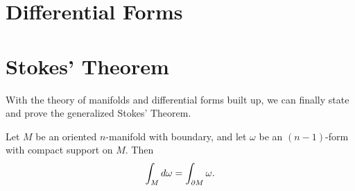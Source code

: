 \documentclass[twoside,10pt]{article}
\begin{document}
\section{Differential Forms}

\section{Stokes' Theorem}

With the theory of manifolds and differential forms built up, we can finally state and prove the generalized Stokes' Theorem.

\begin{thrm}
	Let $M$ be an oriented $n$-manifold with boundary, and let $\omega$ be an $(n-1)$-form with compact support on $M$. Then
	\[
	\int_{M} d\omega = \int_{\partial M}\omega.
	\] 
\end{thrm}
\end{document}
